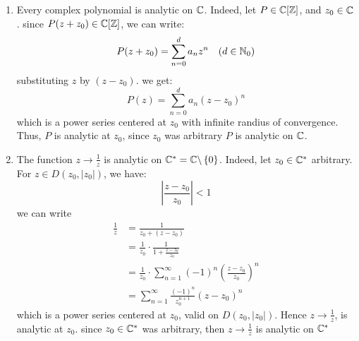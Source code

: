 \begin{example}
  \begin{enumerate}
    \item Every complex polynomial is analytic on $\mathbb{C}  $. Indeed, let $P \in  \mathbb{C} [ \mathbb{Z} ]$, and 
      $z_0 \in   \mathbb{C}  $. since $P(z + z_0)  \in  \mathbb{C} [ \mathbb{Z}]$, we can write: 
      \[
      P(z+z_0)  = 
      \sum_{n=0}^{d} a_n z^n  \quad (d \in   \mathbb{N}_0) 
      \]
      substituting $z $ by $(z-z_0)  $. we get: 
      \[
      P(z) = 
      \sum_{n=0}^{d} a_n (z-z_0) ^n 
      \]
      which is a power series centered at $z_0 $ with infinite randius of convergence. 
      Thus, $P $ is analytic at $z_0 $, since $z_0 $ was arbitrary $P $ is analytic
      on $\mathbb{C}$. 
      \item 
        The function $z \longrightarrow  \frac{1}{z}$ is analytic on 
        $\mathbb{C} ^{*} = \mathbb{C}  \backslash  \left\{ 0 \right\} $. Indeed, let $z_0 \in   \mathbb{C} ^{*} $ arbitrary. \\
        For $z \in  D(z_0, \left| z_0 \right|  )  $, we have: 
        \[
        \left| \frac{z-z_0}{z_0} \right|  < 1
        \]
        we can write 
        \begin{align*}
          \frac{1}{z} &= \frac{1}{z_0 + (z-z_0) } 
          \\
          &= 
          \frac{1}{z_0} \cdot \frac{1}{1 + \frac{z-z_0}{z_0} } \\
          &= 
          \frac{1}{z_0} \cdot  
          \sum_{n=1}^{\infty} (-1) ^n  
          \left( \frac{z-z_0}{z_0} \right) ^n  \\ 
          &= 
          \sum_{n=1}^{\infty} \frac{(-1) ^n }{z_0^{n+1}} 
          (z-z_0) ^n 
        \end{align*}
        which is a power series centered at $z_0 $, valid on $D(z_0, \left| z_0 \right|  )  $. Hence
         $z \longrightarrow \frac{1}{z} $, is analytic at $z_0 $. since $z_0 \in   \mathbb{C} ^{*} $ was
         arbitrary, then $z \longrightarrow \frac{1}{z} $ is analytic on $\mathbb{C} ^{*} $ 
  \end{enumerate}
\end{example}
